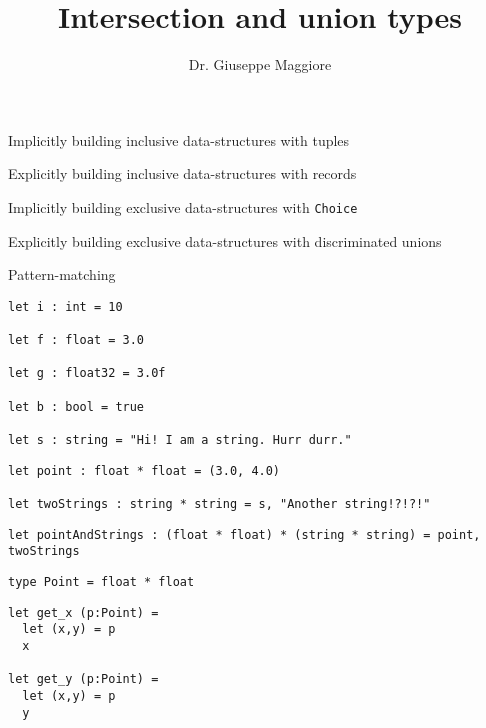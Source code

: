 \documentclass{beamer}
\title{Intersection and union types}
\author{Dr. Giuseppe Maggiore}
\institute{Hogeschool Rotterdam \\ 
Rotterdam, Netherlands}
\date{}
\begin{document}
\maketitle

\begin{slide}{
\item Implicitly building inclusive data-structures with tuples
\item Explicitly building inclusive data-structures with records
\item Implicitly building exclusive data-structures with \texttt{Choice}
\item Explicitly building exclusive data-structures with discriminated unions
\item Pattern-matching
}\end{slide}

\begin{frame}[fragile]
\begin{lstlisting}
let i : int = 10

let f : float = 3.0

let g : float32 = 3.0f

let b : bool = true

let s : string = "Hi! I am a string. Hurr durr."
\end{lstlisting}
\end{frame}

\begin{frame}[fragile]
\begin{lstlisting}
let point : float * float = (3.0, 4.0)

let twoStrings : string * string = s, "Another string!?!?!"
\end{lstlisting}
\end{frame}


\begin{frame}[fragile]
\begin{lstlisting}
let pointAndStrings : (float * float) * (string * string) = point, twoStrings
\end{lstlisting}
\end{frame}

\begin{frame}[fragile]
\begin{lstlisting}
type Point = float * float
\end{lstlisting}
\end{frame}

\begin{frame}[fragile]
\begin{lstlisting}
let get_x (p:Point) = 
  let (x,y) = p
  x

let get_y (p:Point) = 
  let (x,y) = p
  y
\end{lstlisting}
\end{frame}
\end{document}
